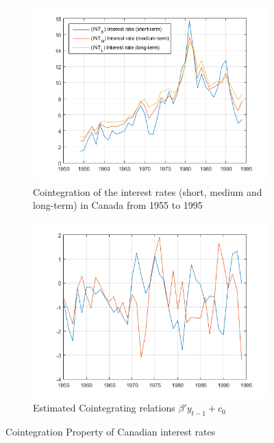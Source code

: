 \documentclass[11pt,a4,twosided,singlespacing,titlepagenumber=on]{scrreprt}
\numberwithin{equation}{chapter} %
\theoremstyle{remark}
\begin{document}
\begin{figure}[H]
    \centering
    \begin{subfigure}[t]{0.49\textwidth}
        \centering
        \includegraphics[width=1\textwidth]{TestMultipleSeriesForCointegrationUsingJcitestExample_01}
        \caption{Cointegration of the interest rates (short, medium and long-term) in Canada from 1955 to 1995}
        \label{TestMultipleSeriesForCointegrationUsingJcitestExample_01}
    \end{subfigure}
    \begin{subfigure}[t]{0.49\textwidth}
        \centering
        \includegraphics[width=1\textwidth]{TestMultipleSeriesForCointegrationUsingJcitestExample_02}
        \caption{Estimated Cointegrating relations $\beta' y_{t-1} + c_0$}
        \label{TestMultipleSeriesForCointegrationUsingJcitestExample_02}
    \end{subfigure}
    \caption{Cointegration Property of Canadian interest rates}
\end{figure}
\end{document}
